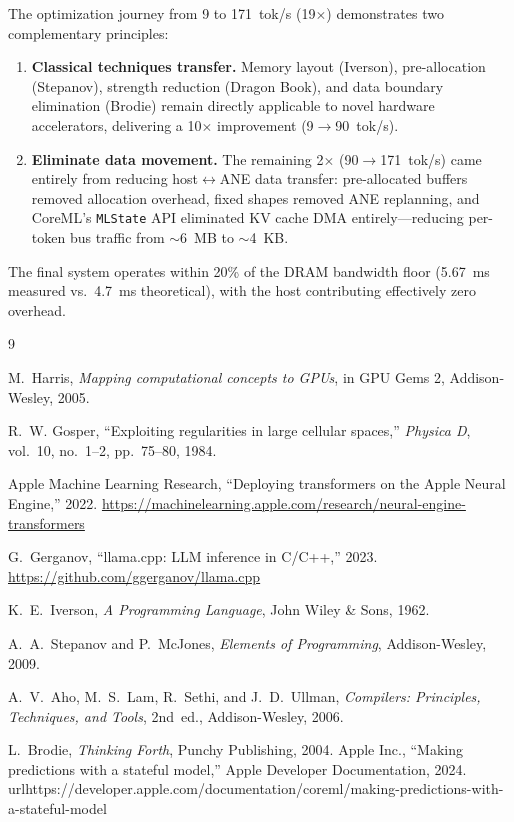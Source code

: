 \documentclass[11pt,twocolumn]{article}
\begin{document}
The optimization journey from 9 to 171~tok/s (19$\times$) demonstrates
two complementary principles:
\begin{enumerate}
\item \textbf{Classical techniques transfer.} Memory layout (Iverson),
  pre-allocation (Stepanov), strength reduction (Dragon Book), and
  data boundary elimination (Brodie) remain directly applicable to
  novel hardware accelerators, delivering a 10$\times$ improvement
  (9$\to$90~tok/s).
\item \textbf{Eliminate data movement.} The remaining 2$\times$
  (90$\to$171~tok/s) came entirely from reducing host$\leftrightarrow$ANE
  data transfer: pre-allocated buffers removed allocation overhead,
  fixed shapes removed ANE replanning, and CoreML's \texttt{MLState}
  API eliminated KV cache DMA entirely---reducing per-token bus
  traffic from $\sim$6~MB to $\sim$4~KB.
\end{enumerate}

The final system operates within 20\% of the DRAM bandwidth floor
(5.67~ms measured vs.\ 4.7~ms theoretical), with the host contributing
effectively zero overhead.


\begin{thebibliography}{9}

M.~Harris, \emph{Mapping computational concepts to GPUs},
in GPU Gems 2, Addison-Wesley, 2005.

R.~W. Gosper, ``Exploiting regularities in large cellular spaces,''
\emph{Physica D}, vol.~10, no.~1--2, pp.~75--80, 1984.

Apple Machine Learning Research, ``Deploying transformers on the Apple
Neural Engine,'' 2022.
\url{https://machinelearning.apple.com/research/neural-engine-transformers}

G.~Gerganov, ``llama.cpp: LLM inference in C/C++,'' 2023.
\url{https://github.com/ggerganov/llama.cpp}

K.~E.~Iverson, \emph{A Programming Language}, John Wiley \& Sons, 1962.

A.~A.~Stepanov and P.~McJones, \emph{Elements of Programming},
Addison-Wesley, 2009.

A.~V.~Aho, M.~S.~Lam, R.~Sethi, and J.~D.~Ullman, \emph{Compilers:
Principles, Techniques, and Tools}, 2nd~ed., Addison-Wesley, 2006.

L.~Brodie, \emph{Thinking Forth}, Punchy Publishing, 2004.
Apple Inc., ``Making predictions with a stateful model,''
Apple Developer Documentation, 2024.
\\url{https://developer.apple.com/documentation/coreml/making-predictions-with-a-stateful-model}
\end{thebibliography}
\end{document}
